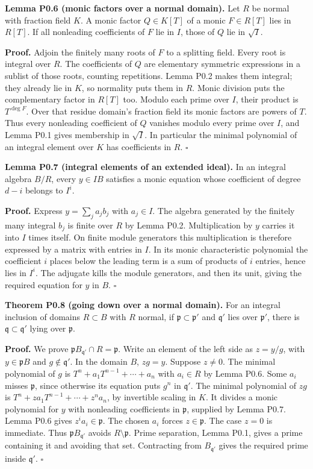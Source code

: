 \documentclass[11pt,a4paper,openany]{report}
\begin{document}
\textbf{Lemma P0.6 (monic factors over a normal domain).} Let \(R\) be normal with fraction field \(K\). A monic factor \(Q\in K[T]\) of a monic \(F\in R[T]\) lies in \(R[T]\). If all nonleading coefficients of \(F\) lie in \(I\), those of \(Q\) lie in \(\sqrt I\).

\textbf{Proof.} Adjoin the finitely many roots of \(F\) to a splitting field. Every root is integral over \(R\). The coefficients of \(Q\) are elementary symmetric expressions in a sublist of those roots, counting repetitions. Lemma P0.2 makes them integral; they already lie in \(K\), so normality puts them in \(R\). Monic division puts the complementary factor in \(R[T]\) too. Modulo each prime over \(I\), their product is \(T^{\deg F}\). Over that residue domain's fraction field its monic factors are powers of \(T\). Thus every nonleading coefficient of \(Q\) vanishes modulo every prime over \(I\), and Lemma P0.1 gives membership in \(\sqrt I\). In particular the minimal polynomial of an integral element over \(K\) has coefficients in \(R\). \(\square\)

\textbf{Lemma P0.7 (integral elements of an extended ideal).} In an integral algebra \(B/R\), every \(y\in IB\) satisfies a monic equation whose coefficient of degree \(d-i\) belongs to \(I^i\).

\textbf{Proof.} Express \(y=\sum_j a_jb_j\) with \(a_j\in I\). The algebra generated by the finitely many integral \(b_j\) is finite over \(R\) by Lemma P0.2. Multiplication by \(y\) carries it into \(I\) times itself. On finite module generators this multiplication is therefore expressed by a matrix with entries in \(I\). In its monic characteristic polynomial the coefficient \(i\) places below the leading term is a sum of products of \(i\) entries, hence lies in \(I^i\). The adjugate kills the module generators, and then its unit, giving the required equation for \(y\) in \(B\). \(\square\)

\textbf{Theorem P0.8 (going down over a normal domain).} For an integral inclusion of domains \(R\subset B\) with \(R\) normal, if \(\mathfrak p\subset\mathfrak p'\) and \(\mathfrak q'\) lies over \(\mathfrak p'\), there is \(\mathfrak q\subset\mathfrak q'\) lying over \(\mathfrak p\).

\textbf{Proof.} We prove \(\mathfrak pB_{\mathfrak q'}\cap R=\mathfrak p\). Write an element of the left side as \(z=y/g\), with \(y\in\mathfrak pB\) and \(g\notin\mathfrak q'\). In the domain \(B\), \(zg=y\). Suppose \(z\ne0\). The minimal polynomial of \(g\) is \(T^n+a_1T^{n-1}+\cdots+a_n\) with \(a_i\in R\) by Lemma P0.6. Some \(a_i\) misses \(\mathfrak p\), since otherwise its equation puts \(g^n\) in \(\mathfrak q'\). The minimal polynomial of \(zg\) is \(T^n+za_1T^{n-1}+\cdots+z^na_n\), by invertible scaling in \(K\). It divides a monic polynomial for \(y\) with nonleading coefficients in \(\mathfrak p\), supplied by Lemma P0.7. Lemma P0.6 gives \(z^ia_i\in\mathfrak p\). The chosen \(a_i\) forces \(z\in\mathfrak p\). The case \(z=0\) is immediate. Thus \(\mathfrak pB_{\mathfrak q'}\) avoids \(R\setminus\mathfrak p\). Prime separation, Lemma P0.1, gives a prime containing it and avoiding that set. Contracting from \(B_{\mathfrak q'}\) gives the required prime inside \(\mathfrak q'\). \(\square\)
\end{document}
